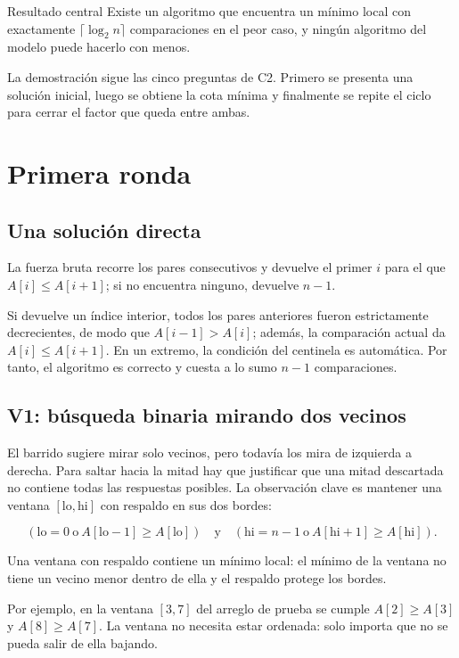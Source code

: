 \documentclass[11pt]{article}
\begin{document}
\begin{resultado}{Resultado central}
Existe un algoritmo que encuentra un mínimo local con exactamente $\lceil\log_2 n\rceil$ comparaciones
en el peor caso, y ningún algoritmo del modelo puede hacerlo con menos.
\end{resultado}

La demostración sigue las cinco preguntas de C2. Primero se presenta una solución inicial, luego se obtiene
la cota mínima y finalmente se repite el ciclo para cerrar el factor que queda entre ambas.

\section{Primera ronda}

\subsection{Una solución directa}

La fuerza bruta recorre los pares consecutivos y devuelve el primer $i$ para el que $A[i]\le A[i+1]$;
si no encuentra ninguno, devuelve $n-1$.

Si devuelve un índice interior, todos los pares anteriores fueron estrictamente decrecientes, de modo que
$A[i-1]>A[i]$; además, la comparación actual da $A[i]\le A[i+1]$. En un extremo, la condición del
centinela es automática. Por tanto, el algoritmo es correcto y cuesta a lo sumo $n-1$ comparaciones.

\subsection{V1: búsqueda binaria mirando dos vecinos}

El barrido sugiere mirar solo vecinos, pero todavía los mira de izquierda a derecha. Para saltar hacia la
mitad hay que justificar que una mitad descartada no contiene todas las respuestas posibles. La observación
clave es mantener una ventana $[\mathrm{lo},\mathrm{hi}]$ con respaldo en sus dos bordes:

\[
(\mathrm{lo}=0\ \text{o}\ A[\mathrm{lo}-1]\ge A[\mathrm{lo}])
\quad\text{y}\quad
(\mathrm{hi}=n-1\ \text{o}\ A[\mathrm{hi}+1]\ge A[\mathrm{hi}]).
\]

Una ventana con respaldo contiene un mínimo local: el mínimo de la ventana no tiene un vecino menor dentro
de ella y el respaldo protege los bordes.

Por ejemplo, en la ventana $[3,7]$ del arreglo de prueba se cumple $A[2]\ge A[3]$ y
$A[8]\ge A[7]$. La ventana no necesita estar ordenada: solo importa que no se pueda salir de ella bajando.
\end{document}
